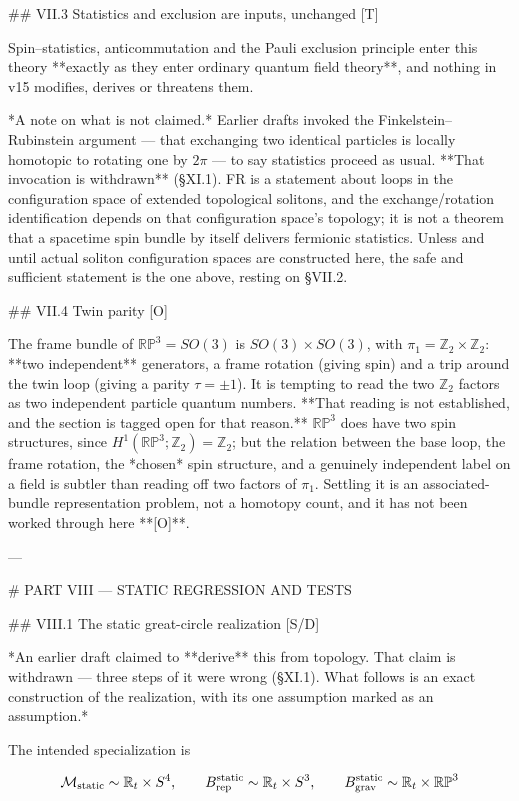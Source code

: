 ## VII.3 Statistics and exclusion are inputs, unchanged [T]

Spin–statistics, anticommutation and the Pauli exclusion principle enter this theory **exactly as they enter ordinary quantum field theory**, and nothing in v15 modifies, derives or threatens them.

*A note on what is not claimed.* Earlier drafts invoked the Finkelstein–Rubinstein argument — that exchanging two identical particles is locally homotopic to rotating one by $2\pi$ — to say statistics proceed as usual. **That invocation is withdrawn** (§XI.1). FR is a statement about loops in the configuration space of extended topological solitons, and the exchange/rotation identification depends on that configuration space's topology; it is not a theorem that a spacetime spin bundle by itself delivers fermionic statistics. Unless and until actual soliton configuration spaces are constructed here, the safe and sufficient statement is the one above, resting on §VII.2.

## VII.4 Twin parity [O]

The frame bundle of $\mathbb{RP}^3 = SO(3)$ is $SO(3)\times SO(3)$, with $\pi_1 = \mathbb{Z}_2\times\mathbb{Z}_2$: **two independent** generators, a frame rotation (giving spin) and a trip around the twin loop (giving a parity $\tau = \pm1$). It is tempting to read the two $\mathbb{Z}_2$ factors as two independent particle quantum numbers. **That reading is not established, and the section is tagged open for that reason.** $\mathbb{RP}^3$ does have two spin structures, since $H^1(\mathbb{RP}^3;\mathbb{Z}_2) = \mathbb{Z}_2$; but the relation between the base loop, the frame rotation, the *chosen* spin structure, and a genuinely independent label on a field is subtler than reading off two factors of $\pi_1$. Settling it is an associated-bundle representation problem, not a homotopy count, and it has not been worked through here **[O]**.

---

# PART VIII — STATIC REGRESSION AND TESTS

## VIII.1 The static great-circle realization [S/D]

*An earlier draft claimed to **derive** this from topology. That claim is withdrawn — three steps of it were wrong (§XI.1). What follows is an exact construction of the realization, with its one assumption marked as an assumption.*

The intended specialization is

$$\mathcal{M}_{\rm static}\sim\mathbb{R}_t\times S^4,\qquad B_{\rm rep}^{\rm static}\sim\mathbb{R}_t\times S^3,\qquad B_{\rm grav}^{\rm static}\sim\mathbb{R}_t\times\mathbb{RP}^3$$

